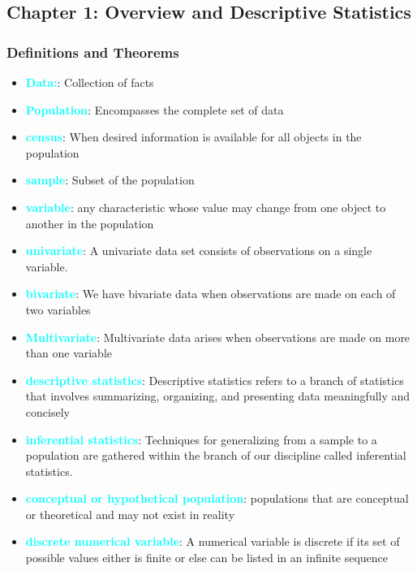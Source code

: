 \documentclass{report}
\begin{document}
    \pagebreak 
    \bigbreak \noindent 
    \subsection{Chapter 1: Overview and Descriptive Statistics}
    \bigbreak \noindent 
    \subsubsection{Definitions and Theorems}
    \begin{itemize}
        \item \textbf{\textcolor{cyan}{Data:}}: Collection of facts
        \item \textbf{\textcolor{cyan}{Population}}: Encompasses the complete set of data
        \item \textbf{\textcolor{cyan}{census}}: When desired information is available for all objects in the population
        \item \textbf{\textcolor{cyan}{sample}}: Subset of the population
        \item \textbf{\textcolor{cyan}{variable}}: any characteristic whose value may change from one object to another in the population
        \item \textbf{\textcolor{cyan}{univariate}}: A univariate data set consists of observations on a single variable.
        \item \textbf{\textcolor{cyan}{bivariate}}: We have bivariate data when observations are made on each of two variables
        \item \textbf{\textcolor{cyan}{Multivariate}}: Multivariate data arises when observations are made on more than one variable
        \item \textbf{\textcolor{cyan}{descriptive statistics}}: Descriptive statistics refers to a branch of statistics that involves summarizing, organizing, and presenting data meaningfully and concisely
        \item \textbf{\textcolor{cyan}{inferential statistics}}: Techniques for generalizing from a sample to a population are gathered within the branch of our discipline called inferential statistics.
        \item \textbf{\textcolor{cyan}{conceptual or hypothetical population}}: populations that are conceptual or theoretical and may not exist in reality
        \item \textbf{\textcolor{cyan}{discrete numerical variable}}: A numerical variable is discrete if its set of possible values either is finite or else can be listed in an infinite sequence

\end{itemize}
\end{document}
